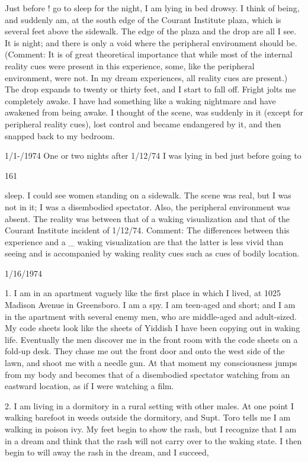 \documentclass[10pt,twoside]{memoir}
\begin{document}
\begin{enumerate}
{\begin{enumerate}
\begin{sysrules}
\begin{sysrules}
\begin{sysrules}
\begin{sysrules}
{\begin{enumerate}
{{{{{{Just before ! go to sleep for the night, I am lying in bed drowsy. I think 
of being, and suddenly am, at the south edge of the Courant Institute plaza, 
which is several feet above the sidewalk. The edge of the plaza and the drop 
are all I see. It is night; and there is only a void where the peripheral 
environment should be. (Comment: It is of great theoretical importance that 
while most of the internal reality cues were present in this experience, some, 
like the peripheral environment, were not. In my dream experiences, all 
reality cues are present.) The drop expands to twenty or thirty feet, and I 
start to fall off. Fright jolts me completely awake. I have had something like 
a waking nightmare and have awakened from being awake. I thought of the 
scene, was suddenly in it (except for peripheral reality cues), lost control and 
became endangered by it, and then snapped back to my bedroom. 


1/1-/1974 
One or two nights after 1/12/74 I was lying in bed just before going to 


161 


sleep. I could see women standing on a sidewalk. The scene was real, but I 
was not in it; I was a disembodied spectator. Also, the peripheral 
environment was absent. The reality was between that of a waking 
visualization and that of the Courant Institute incident of 1/12/74. 
Comment: The differences between this experience and a _ waking 
visualization are that the latter is less vivid than seeing and is accompanied 
by waking reality cues such as cues of bodily location. 


1/16/1974 

1. I am in an apartment vaguely like the first place in which I lived, at 
1025 Madison Avenue in Greensboro. I am a spy. I am teen-aged and short; 
and I am in the apartment with several enemy men, who are middle-aged and 
adult-sized. My code sheets look like the sheets of Yiddish I have been 
copying out in waking life. Eventually the men discover me in the front 
room with the code sheets on a fold-up desk. They chase me out the front 
door and onto the west side of the lawn, and shoot me with a needle gun. At 
that moment my consciousness jumps from my body and becomes that of a 
disembodied spectator watching from an eastward location, as if I were 
watching a film. 

2. I am living in a dormitory in a rural setting with other males. At one 
point I walking barefoot in weeds outside the dormitory, and Supt. Toro 
tells me I am walking in poison ivy. My feet begin to show the rash, but I 
recognize that I am in a dream and think that the rash will not carry over to 
the waking state. I then begin to will away the rash in the dream, and I 
succeed, 


}}}}}}
\end{enumerate}}
\end{sysrules}
\end{sysrules}
\end{sysrules}
\end{sysrules}
\end{enumerate}}
\end{enumerate}
\end{document}
